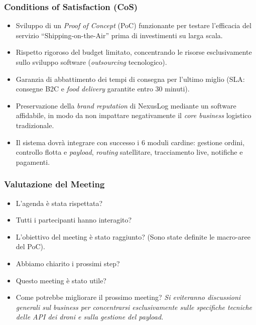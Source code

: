 \documentclass[12pt, a4paper]{article}
\begin{document}
\subsubsection*{Conditions of Satisfaction (CoS)}
\begin{itemize}
    \item Sviluppo di un \textit{Proof of Concept} (PoC) funzionante per testare l'efficacia del servizio ``Shipping-on-the-Air'' prima di investimenti su larga scala.
    \item Rispetto rigoroso del budget limitato, concentrando le risorse esclusivamente sullo sviluppo software (\textit{outsourcing} tecnologico).
    \item Garanzia di abbattimento dei tempi di consegna per l'ultimo miglio (SLA: consegne B2C e \textit{food delivery} garantite entro 30 minuti).
    \item Preservazione della \textit{brand reputation} di NexusLog mediante un software affidabile, in modo da non impattare negativamente il \textit{core business} logistico tradizionale.
    \item Il sistema dovrà integrare con successo i 6 moduli cardine: gestione ordini, controllo flotta e \textit{payload}, \textit{routing} satellitare, tracciamento live, notifiche e pagamenti.
\end{itemize}

\subsubsection*{Valutazione del Meeting}
\begin{itemize}
    \item[\textbf{[SÌ]}] L'agenda è stata rispettata?
    \item[\textbf{[SÌ]}] Tutti i partecipanti hanno interagito?
    \item[\textbf{[SÌ]}] L'obiettivo del meeting è stato raggiunto? (Sono state definite le macro-aree del PoC).
    \item[\textbf{[SÌ]}] Abbiamo chiarito i prossimi step?
    \item[\textbf{[SÌ]}] Questo meeting è stato utile?
    \item[\textbf{[Note]}] Come potrebbe migliorare il prossimo meeting? \textit{Si eviteranno discussioni generali sul business per concentrarsi esclusivamente sulle specifiche tecniche delle API dei droni e sulla gestione del payload.}
\end{itemize}
\end{document}
